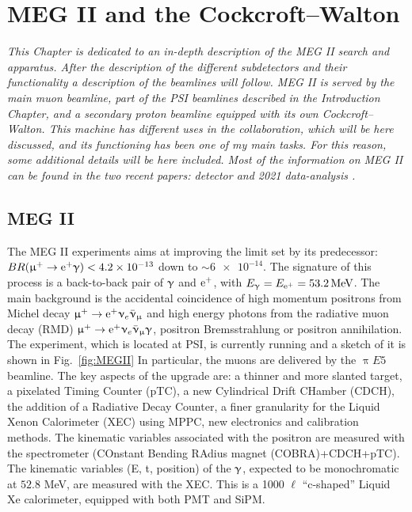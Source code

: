 \chapter{MEG II and the Cockcroft–Walton}
\label{ch:MEG}
\begin{refsection}
{\itshape This Chapter is dedicated to an in-depth description of the MEG II search and apparatus. After the description of the different subdetectors and their functionality a description of the beamlines will follow. MEG II is served by the main muon beamline, part of the PSI beamlines described in the Introduction Chapter, and a secondary proton beamline equipped with its own Cockcroft–Walton. This machine has different uses in the collaboration, which will be here discussed, and its functioning has been one of my main tasks. For this reason, some additional details will be here included. Most of the information on MEG II can be found in the two recent papers: detector \cite{MEG_II:detector} and 2021 data-analysis \cite{MEG_II:physics}.}

\section{MEG II}
    The MEG II experiments aims at improving the limit set by its predecessor: $BR(\upmu^+\rightarrow\text{e}^+\upgamma)<\num{4.2e-13}$ \cite{MEG} down to $\sim\num{6e-14}$.
    The signature of this process is a back-to-back pair of $\upgamma$ and $\text{e}^+$, with $E_\upgamma = E_{\text{e}^+} = \SI{53.2}{MeV}$.
    The main background is the accidental coincidence of high momentum positrons from Michel decay $\upmu^+ \rightarrow \text{e}^+ \upnu_e \bar{\upnu}_\upmu$ and high energy photons from the radiative muon decay (RMD) $\upmu^+\rightarrow\text{e}^+\upnu_e \bar{\upnu}_\upmu\upgamma$, positron Bremsstrahlung or positron annihilation.\\
    The experiment, which is located at PSI, is currently running and a sketch of it is shown in Fig.~\ref{fig:MEGII}
    In particular, the muons are delivered by the $\uppi E5$ beamline.
    The key aspects of the upgrade are: a thinner and more slanted target, a pixelated Timing Counter (pTC), a new Cylindrical Drift CHamber (CDCH), the addition of a Radiative Decay Counter, a finer granularity for the Liquid Xenon Calorimeter (XEC) using MPPC, new electronics and calibration methods.
    The kinematic variables associated with the positron are measured with the spectrometer (COnstant Bending RAdius magnet (COBRA)+CDCH+pTC). 
    The kinematic variables (E, t, position) of the $\upgamma$, expected to be monochromatic at $52.8$ MeV, are measured with the XEC.
    This is a 1000 $\ell$ ``c-shaped'' Liquid Xe calorimeter, equipped with both PMT and SiPM.\\

\end{refsection}
